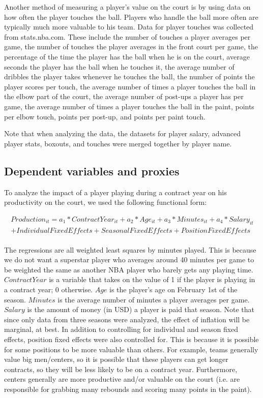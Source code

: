 \documentclass[12pt]{article}
\begin{document}
	Another method of measuring a player's value on the court is by using data on how often the player touches the ball. Players who handle the ball more often are typically much more valuable to his team. Data for player touches was collected from stats.nba.com. These include the number of touches a player averages per game, the number of touches the player averages in the front court per game, the percentage of the time the player has the ball when he is on the court, average seconds the player has the ball when he touches it, the average number of dribbles the player takes whenever he touches the ball, the number of points the player scores per touch, the average number of times a player touches the ball in the elbow part of the court, the average number of post-ups a player has per game, the average number of times a player touches the ball in the paint, points per elbow touch, points per post-up, and points per paint touch. 
	
	Note that when analyzing the data, the datasets for player salary, advanced player stats, boxouts, and touches were merged together by player name. 
	
	\subsection{Dependent variables and proxies}
	
	To analyze the impact of a player playing during a contract year on his productivity on the court, we used the following functional form:
	
	\[
	\begin{aligned}
	Production_{it} = a_1*ContractYear_{it} + a_2*Age_{it} + a_3*Minutes_{it} + a_4*Salary_{it}  \\
	+ IndividualFixedEffects + SeasonalFixedEffects + PositionFixedEffects \\
	\end{aligned}
	\]
	
	The regressions are all weighted least squares by minutes played. This is because we do not want a superstar player who averages around 40 minutes per game to be weighted the same as another NBA player who barely gets any playing time. $ContractYear$ is a variable that takes on the value of 1 if the player is playing in a contract year; 0 otherwise. $Age$ is the player's age on February 1st of the season. $Minutes$ is the average number of minutes a player averages per game. $Salary$ is the amount of money (in USD) a player is paid that season. Note that since only data from three seasons were analyzed, the effect of inflation will be marginal, at best. In addition to controlling for individual and season fixed effects, position fixed effects were also controlled for. This is because it is possible for some positions to be more valuable than others. For example, teams generally value big men/centers, so it is possible that these players can get longer contracts, so they will be less likely to be on a contract year. Furthermore, centers generally are more productive and/or valuable on the court (i.e. are responsible for grabbing many rebounds and scoring many points in the paint). 
	
\end{document}
